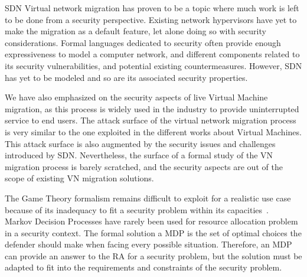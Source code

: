 SDN Virtual network migration has proven to be a topic where much work is left to be done from a security perspective.
Existing network hypervisors have yet to make the migration as a default feature, let alone doing so with security considerations.
Formal languages dedicated to security often provide enough expressiveness to model a computer network, and different components related to its security vulnerabilities, and potential existing countermeasures.
However, SDN has yet to be modeled and so are its associated security properties.

We have also emphasized on the security aspects of live Virtual Machine migration, as this process is widely used in the industry to provide uninterrupted service to end users. 
The attack surface of the virtual network migration process is very similar to the one exploited in the different works about Virtual Machines. This attack surface is also augmented by the security issues and challenges introduced by SDN. Nevertheless, the surface of a formal study of the VN migration process is barely scratched, and the security aspects are out of the scope of existing VN migration solutions.

The Game Theory formalism remains difficult to exploit for a realistic use case because of its inadequacy to fit a security problem within its capacities~\cite{Kiennert2018}. \\
Markov Decision Processes have rarely been used for resource allocation problem in a security context. The formal solution a MDP is the set of optimal choices the defender should make when facing every possible situation. Therefore, an MDP can provide an answer to the RA for a security problem, but the solution must be adapted to fit into the requirements and constraints of the security problem.
